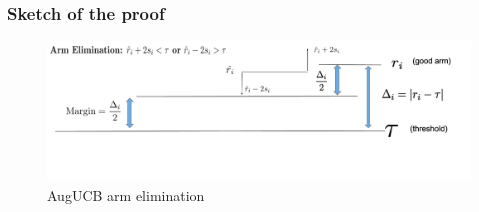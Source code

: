 \begin{frame}
\frametitle{Sketch of the proof}
\begin{figure}
\caption{AugUCB arm elimination}
\includegraphics[scale=0.278]{img/ArmElim2.png}
\end{figure}
% 
%
\end{frame}



